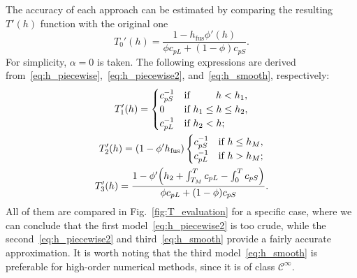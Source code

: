 \documentclass{article}
\newcommand{\fusion}[1]{{#1}_\mathrm{fus}}
\begin{document}
The accuracy of each approach can be estimated by comparing the resulting $T'(h)$ function
with the original one
\begin{equation}\label{eq:T_prime}
    T_0'(h) = \frac{1 - \fusion{h}\phi'(h)}{\phi c_{pL} + (1-\phi)c_{pS}}.
\end{equation}
For simplicity, $\alpha=0$ is taken. The following expressions are derived
from~\eqref{eq:h_piecewise},~\eqref{eq:h_piecewise2}, and~\eqref{eq:h_smooth}, respectively:
\begin{gather}
    T_1'(h) = \begin{cases}
        c_{pS}^{-1} &\text{if }\qquad\,\, h < h_1, \\
        0           &\text{if } h_1 \leq h \leq h_2, \\
        c_{pL}^{-1} &\text{if } h_2 < h;
    \end{cases}\label{eq:T_prime1}\\
    T_2'(h) = (1-\phi'\fusion{h})\begin{cases}
        c_{pS}^{-1} &\text{if } h \leq h_M, \\
        c_{pL}^{-1} &\text{if } h > h_M;
    \end{cases}\label{eq:T_prime2}\\
    T_3'(h) = \frac{ 1-\phi'\qty( h_2 + \int_{T_M}^T c_{pL} - \int_0^T c_{pS} ) }
        { \phi c_{pL} + (1-\phi)c_{pS} }. \label{eq:T_prime3}
\end{gather}
All of them are compared in Fig.~\ref{fig:T_evaluation} for a specific case,
where we can conclude that the first model~\eqref{eq:h_piecewise2} is too crude,
while the second~\eqref{eq:h_piecewise2} and third~\eqref{eq:h_smooth}
provide a fairly accurate approximation.
It is worth noting that the third model~\eqref{eq:h_smooth} is preferable
for high-order numerical methods, since it is of class $\mathcal{C}^\infty$.

\printbibliography
\end{document}
